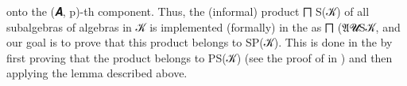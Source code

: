 \documentclass[a4paper,UKenglish,cleveref,autoref,thm-restate]{lipics-v2021}
\begin{document}
onto the (\ab 𝑨, \ab p)-th component.
Thus, the (informal) product \af ⨅ \ad S(\ab 𝒦) of all subalgebras of algebras in \ab 𝒦 is implemented (formally) in the \ualib as \af ⨅ \as (\af 𝔄\as{\{}\ab 𝓤\as{\}\{}\ad S\as{(}\ab 𝒦\as{)\})}, and our goal is to prove that this product %
belongs to \ad S\ad P(\ab 𝒦). This is done in the \ualib by first proving that the product belongs to \ad P\ad S(\ab 𝒦) (see the proof of  in \ualibVarieties) and then applying the  lemma described above.


\end{document}
